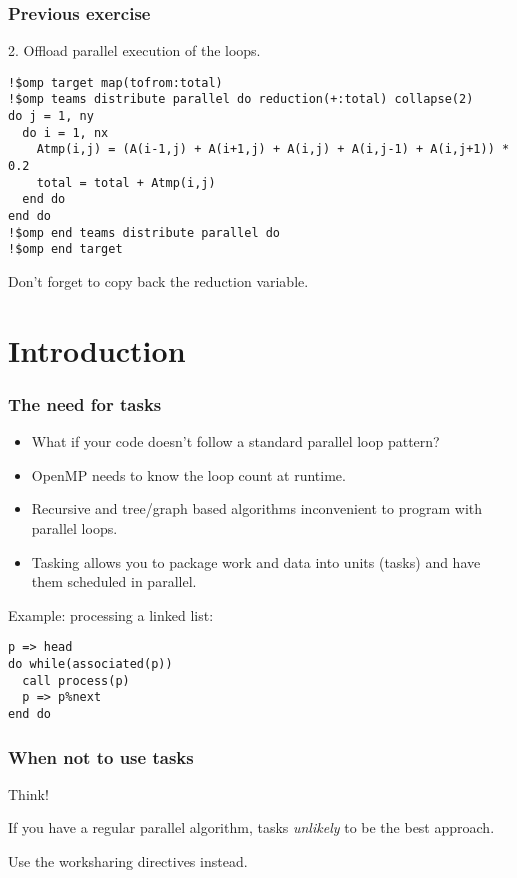 \documentclass{beamer}
\begin{document}
\begin{frame}[fragile]
\frametitle{Previous exercise}

2. Offload parallel execution of the loops.
\begin{verbatim}
!$omp target map(tofrom:total)
!$omp teams distribute parallel do reduction(+:total) collapse(2)
do j = 1, ny
  do i = 1, nx
    Atmp(i,j) = (A(i-1,j) + A(i+1,j) + A(i,j) + A(i,j-1) + A(i,j+1)) * 0.2
    total = total + Atmp(i,j)
  end do
end do
!$omp end teams distribute parallel do
!$omp end target
\end{verbatim}

Don't forget to copy back the reduction variable.

\end{frame}

\section{Introduction}
\begin{frame}[fragile]
\frametitle{The need for tasks}
\begin{itemize}
  \item What if your code doesn't follow a standard parallel loop pattern?
  \item OpenMP needs to know the loop count at runtime.
  \item Recursive and tree/graph based algorithms inconvenient to program with parallel loops.
  \item Tasking allows you to package work and data into units (tasks) and have them scheduled in parallel.
\end{itemize}

Example: processing a linked list:
\begin{verbatim}
p => head
do while(associated(p))
  call process(p)
  p => p%next
end do
\end{verbatim}
\end{frame}

\begin{frame}
\frametitle{When not to use tasks}

\begin{alertblock}{Think!}

If you have a regular parallel algorithm, tasks \emph{unlikely} to be the best approach.

\vfill

Use the worksharing directives instead.

\end{alertblock}

\end{frame}
\end{document}
